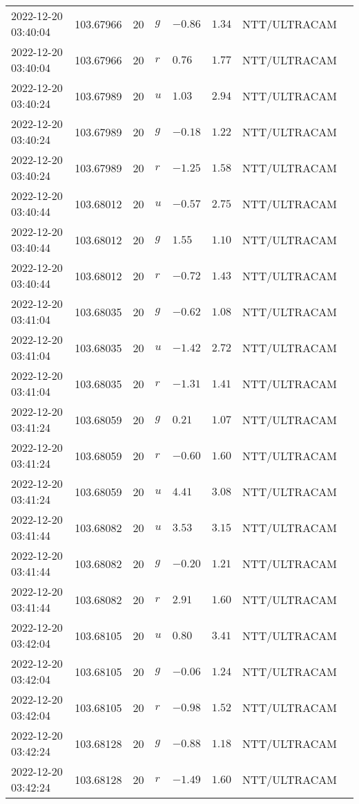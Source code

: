 \documentclass{nature_plusfigure}
\begin{document}
\begin{supplement}
\begin{center}
\begin{longtable}{llllllll}
2022-12-20 03:40:04 & 103.67966 & 20 & $g$ & $-0.86$ & $1.34$ & NTT/ULTRACAM &  \\ 
2022-12-20 03:40:04 & 103.67966 & 20 & $r$ & $0.76$ & $1.77$ & NTT/ULTRACAM &  \\ 
2022-12-20 03:40:24 & 103.67989 & 20 & $u$ & $1.03$ & $2.94$ & NTT/ULTRACAM &  \\ 
2022-12-20 03:40:24 & 103.67989 & 20 & $g$ & $-0.18$ & $1.22$ & NTT/ULTRACAM &  \\ 
2022-12-20 03:40:24 & 103.67989 & 20 & $r$ & $-1.25$ & $1.58$ & NTT/ULTRACAM &  \\ 
2022-12-20 03:40:44 & 103.68012 & 20 & $u$ & $-0.57$ & $2.75$ & NTT/ULTRACAM &  \\ 
2022-12-20 03:40:44 & 103.68012 & 20 & $g$ & $1.55$ & $1.10$ & NTT/ULTRACAM &  \\ 
2022-12-20 03:40:44 & 103.68012 & 20 & $r$ & $-0.72$ & $1.43$ & NTT/ULTRACAM &  \\ 
2022-12-20 03:41:04 & 103.68035 & 20 & $g$ & $-0.62$ & $1.08$ & NTT/ULTRACAM &  \\ 
2022-12-20 03:41:04 & 103.68035 & 20 & $u$ & $-1.42$ & $2.72$ & NTT/ULTRACAM &  \\ 
2022-12-20 03:41:04 & 103.68035 & 20 & $r$ & $-1.31$ & $1.41$ & NTT/ULTRACAM &  \\ 
2022-12-20 03:41:24 & 103.68059 & 20 & $g$ & $0.21$ & $1.07$ & NTT/ULTRACAM &  \\ 
2022-12-20 03:41:24 & 103.68059 & 20 & $r$ & $-0.60$ & $1.60$ & NTT/ULTRACAM &  \\ 
2022-12-20 03:41:24 & 103.68059 & 20 & $u$ & $4.41$ & $3.08$ & NTT/ULTRACAM &  \\ 
2022-12-20 03:41:44 & 103.68082 & 20 & $u$ & $3.53$ & $3.15$ & NTT/ULTRACAM &  \\ 
2022-12-20 03:41:44 & 103.68082 & 20 & $g$ & $-0.20$ & $1.21$ & NTT/ULTRACAM &  \\ 
2022-12-20 03:41:44 & 103.68082 & 20 & $r$ & $2.91$ & $1.60$ & NTT/ULTRACAM &  \\ 
2022-12-20 03:42:04 & 103.68105 & 20 & $u$ & $0.80$ & $3.41$ & NTT/ULTRACAM &  \\ 
2022-12-20 03:42:04 & 103.68105 & 20 & $g$ & $-0.06$ & $1.24$ & NTT/ULTRACAM &  \\ 
2022-12-20 03:42:04 & 103.68105 & 20 & $r$ & $-0.98$ & $1.52$ & NTT/ULTRACAM &  \\ 
2022-12-20 03:42:24 & 103.68128 & 20 & $g$ & $-0.88$ & $1.18$ & NTT/ULTRACAM &  \\ 
2022-12-20 03:42:24 & 103.68128 & 20 & $r$ & $-1.49$ & $1.60$ & NTT/ULTRACAM &  \\ 

\end{longtable}
\end{center}
\end{supplement}
\end{document}
